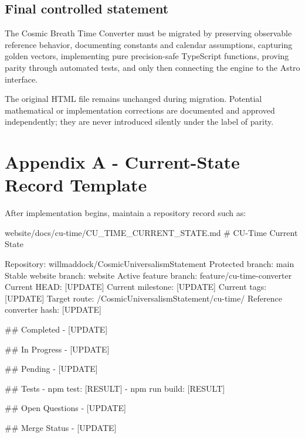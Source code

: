 \documentclass[11pt,letterpaper]{article}
\begin{document}
\subsection{Final controlled statement}

\begin{tcolorbox}[
    enhanced,
    breakable,
    colback=CUNavy,
    colframe=CUGold,
    coltitle=CUNavy,
    colbacktitle=CUGoldLight,
    boxrule=1pt,
    arc=2mm,
    title=\textbf{Controlled Migration Rule}
]
\color{white}

The Cosmic Breath Time Converter must be migrated by preserving observable
reference behavior, documenting constants and calendar assumptions, capturing
golden vectors, implementing pure precision-safe TypeScript functions, proving
parity through automated tests, and only then connecting the engine to the
Astro interface.

The original HTML file remains unchanged during migration. Potential
mathematical or implementation corrections are documented and approved
independently; they are never introduced silently under the label of parity.

\end{tcolorbox}

\appendix
\section{Appendix A - Current-State Record Template}

After implementation begins, maintain a repository record such as:

\begin{codebox}{website/docs/cu-time/CU\_TIME\_CURRENT\_STATE.md}
# CU-Time Current State

Repository: willmaddock/CosmicUniversalismStatement
Protected branch: main
Stable website branch: website
Active feature branch: feature/cu-time-converter
Current HEAD: [UPDATE]
Current milestone: [UPDATE]
Current tags: [UPDATE]
Target route: /CosmicUniversalismStatement/cu-time/
Reference converter hash: [UPDATE]

## Completed
- [UPDATE]

## In Progress
- [UPDATE]

## Pending
- [UPDATE]

## Tests
- npm test: [RESULT]
- npm run build: [RESULT]

## Open Questions
- [UPDATE]

## Merge Status
- [UPDATE]
\end{codebox}
\end{document}
